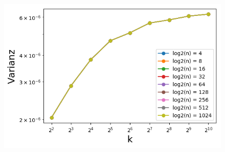 \begin{figure}[H]
    \hspace*{-1cm}
    \begin{minipage}[t]{.30\textwidth}
        \centering
        \includegraphics[width=1.2\textwidth]{pictures/min_filter_V_k.png}
    \end{minipage}
    \hspace*{.8cm}
    \begin{minipage}[t]{.30\textwidth}
        \centering
    \end{minipage}  
    \hspace*{.8cm}
    \begin{minipage}[t]{.30\textwidth}
        \centering

\end{minipage}
\end{figure}
